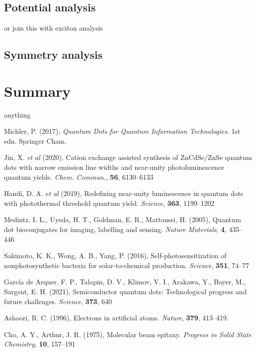 \documentclass[12pt]{article}
\begin{document}
\subsection{Potential analysis}
or join this with exciton analysis

\subsection{Symmetry analysis}

\section{Summary}
anything

\begin{thebibliography}{10}

Michler, P. (2017), \textit{Quantum Dots for Quantum Information Technologies}. 1st edn. Springer Cham.

Jin, X. \textit{et al} (2020), Cation exchange assisted synthesis of ZnCdSe/ZnSe quantum dots with narrow emission line widths and near-unity photoluminescence quantum yields. \textit{Chem. Commun.}, \textbf{56}, 6130--6133

Hanifi, D. A. \textit{et al} (2019), Redefining near-unity luminescence in quantum dots with photothermal threshold quantum yield. \textit{Science}, \textbf{363}, 1199--1202

Medintz, I. L., Uyeda, H. T., Goldman, E. R., Mattoussi, H. (2005),
Quantum dot bioconjugates for imaging, labelling and sensing. \textit{Nature Materials}, \textbf{4}, 435--446

Sakimoto, K. K., Wong, A. B., Yang, P. (2016), Self-photosensitization
of nonphotosynthetic bacteria for solar-to-chemical production. \textit{Science}, \textbf{351}, 74--77

García de Arquer, F. P., Talapin, D. V., Klimov, V. I., Arakawa, Y., Bayer, M., Sargent, E. H. (2021), Semiconductor quantum dots: Technological progress and future challenges. \textit{Science}, \textbf{373}, 640 

Ashoori, R. C. (1996), Electrons in artificial atoms. \textit{Nature}, \textbf{379}, 413--419.

Cho, A. Y., Arthur, J. R. (1975), Molecular beam epitaxy. \textit{Progress in Solid State Chemistry}, \textbf{10}, 157--191


\end{thebibliography}
\end{document}
